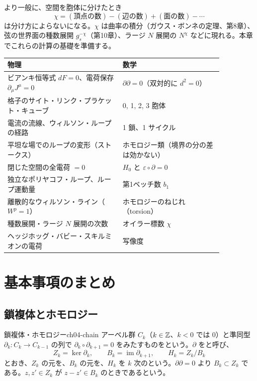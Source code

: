 より一般に、空間を胞体に分けたとき
\[
\chi=(\text{頂点の数})-(\text{辺の数})+(\text{面の数})-\cdots
\]
は分け方によらないになる。$\chi$ は曲率の積分（ガウス・ボンネの定理、第8章）、弦の世界面の種数展開 $g_s^{-\chi}$（第10章）、ラージ $N$ 展開の $N^{\chi}$ などに現れる。本章でこれらの計算の基礎を準備する。

\begin{physbox}[：本章の辞書]
\begin{center}
\small
\renewcommand{\arraystretch}{1.15}
\begin{tabular}{p{0.46\linewidth}p{0.40\linewidth}}
物理 & 数学\\ \hline
ビアンキ恒等式 $dF=0$、電荷保存 $\partial_\mu J^\mu=0$ & $\partial\partial=0$（双対的に $d^2=0$）\\
格子のサイト・リンク・プラケット・キューブ & 0, 1, 2, 3 胞体\\
電流の流線、ウィルソン・ループの経路 & 1 鎖、1 サイクル\\
平坦な場でのループの変形（ストークス） & ホモロジー類（境界の分の差は効かない）\\
閉じた空間の全電荷 $=0$ & $H_0$ と $\varepsilon\circ\partial=0$\\
独立なポリヤコフ・ループ、ループ運動量 & 第1ベッチ数 $b_1$\\
離散的なウィルソン・ライン（$W^p=1$） & ホモロジーのねじれ（torsion）\\
種数展開・ラージ $N$ 展開の次数 & オイラー標数 $\chi$\\
ヘッジホッグ・バビー・スキルミオンの電荷 & 写像度
\end{tabular}
\end{center}
\end{physbox}

\section{基本事項のまとめ}

\subsection{鎖複体とホモロジー}

\begin{mydef}{鎖複体・ホモロジー}{ch04-chain}
アーベル群 $C_k$（$k\in\mathbb{Z}$、$k<0$ では $0$）と準同型 $\partial_k\colon C_k\to C_{k-1}$ の列で $\partial_{k}\circ\partial_{k+1}=0$ をみたすものをという。$\partial$ をと呼び、
\[
Z_k=\ker\partial_k,\qquad B_k=\operatorname{im}\partial_{k+1},\qquad H_k=Z_k/B_k
\]
とおき、$Z_k$ の元を、$B_k$ の元を、$H_k$ を $k$ 次のという。$\partial\partial=0$ より $B_k\subset Z_k$ である。$z,z'\in Z_k$ が $z-z'\in B_k$ のときであるという。
\end{mydef}

